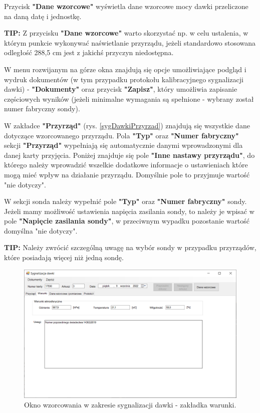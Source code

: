 	Przycisk \textbf{"Dane wzorcowe"} wyświetla dane wzorcowe mocy dawki przeliczone na daną datę i jednostkę.
	
	\textbf{TIP:} Z przycisku \textbf{"Dane wzorcowe"} warto skorzystać np. w celu ustalenia, w którym punkcie wykonywać naświetlanie przyrządu, jeżeli standardowo stosowana odległość 288,5 cm jest z jakichś przyczyn niedostępna.
	
	W menu rozwijanym na górze okna znajdują się opcje umożliwiające podgląd i wydruk dokumentów (w tym przypadku protokołu kalibracyjnego sygnalizacji dawki) - \textbf{"Dokumenty"} oraz przycisk \textbf{"Zapisz"}, który umożliwia zapisanie częściowych wyników (jeżeli minimalne wymagania są spełnione - wybrany został numer fabryczny sondy).
	
	W zakładce \textbf{"Przyrząd"} (rys. \ref{sygDawkiPrzyrzad}) znajdują się wszystkie dane dotyczące wzorcowanego przyrządu. Pola \textbf{"Typ"} oraz \textbf{"Numer fabryczny"} sekcji \textbf{"Przyrząd"} wypełniają się automatycznie danymi wprowadzonymi dla danej karty przyjęcia. Poniżej znajduje się pole \textbf{"Inne nastawy przyrządu"}, do którego należy wprowadzić wszelkie dodatkowe informacje o ustawieniach które mogą mieć wpływ na działanie przyrządu. Domyślnie pole to przyjmuje wartość "nie dotyczy".
	
	W sekcji sonda należy wypełnić pole \textbf{"Typ"} oraz \textbf{"Numer fabryczny"} sondy. Jeżeli mamy możliwość ustawienia napięcia zasilania sondy, to należy je wpisać w pole \textbf{"Napięcie zasilania sondy"}, w przeciwnym wypadku pozostanie wartość domyślna "nie dotyczy".
	
	\textbf{TIP:} Należy zwrócić szczególną uwagę na wybór sondy w przypadku przyrządów, które posiadają więcej niż jedną sondę.
	
		
	\begin{figure}[htb]
		\centering
		\includegraphics[width=\columnwidth]{obrazki/Wzorcowanie/syg_dawki/warunki.png}
		\caption{Okno wzorcowania w zakresie sygnalizacji dawki - zakładka warunki.}
		\label{sygDawkiWarunki}
	\end{figure}
	

